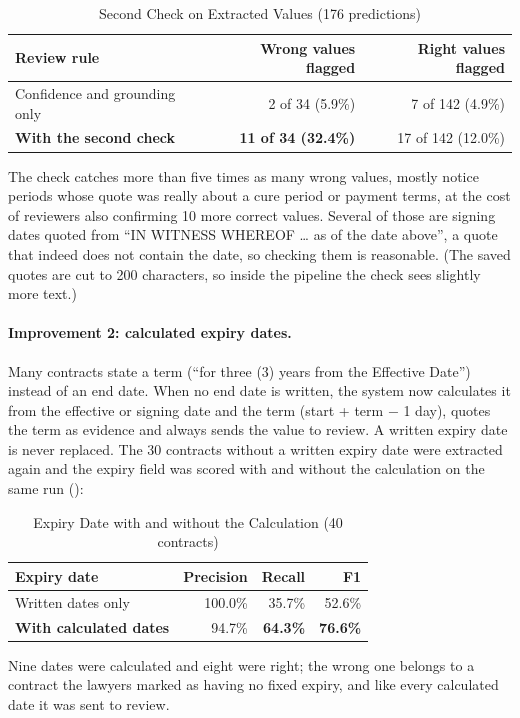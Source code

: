 \begin{table}[H]\centering
\caption{Second Check on Extracted Values (176 predictions)}\label{tab:ev-verify}
\begin{tabular}{|l|r|r|}\hline
\textbf{Review rule} & \textbf{Wrong values flagged} & \textbf{Right values flagged} \\ \hline
Confidence and grounding only & 2 of 34 (5.9\%) & 7 of 142 (4.9\%) \\ \hline
\textbf{With the second check} & \textbf{11 of 34 (32.4\%)} & 17 of 142 (12.0\%) \\ \hline
\end{tabular}
\end{table}
The check catches more than five times as many wrong values, mostly notice periods whose quote was really
about a cure period or payment terms, at the cost of reviewers also confirming 10 more correct values. Several
of those are signing dates quoted from ``IN WITNESS WHEREOF \dots{} as of the date above'', a quote that indeed
does not contain the date, so checking them is reasonable. (The saved quotes are cut to 200 characters, so
inside the pipeline the check sees slightly more text.)

\paragraph*{Improvement 2: calculated expiry dates.} Many contracts state a term (``for three (3) years from the
Effective Date'') instead of an end date. When no end date is written, the system now calculates it from the
effective or signing date and the term (start + term $-$ 1 day), quotes the term as evidence and always sends
the value to review. A written expiry date is never replaced. The 30 contracts without a written expiry date
were extracted again and the expiry field was scored with and without the calculation on the same run
():

\begin{table}[H]\centering
\caption{Expiry Date with and without the Calculation (40 contracts)}\label{tab:ev-expiry}
\begin{tabular}{|l|r|r|r|}\hline
\textbf{Expiry date} & \textbf{Precision} & \textbf{Recall} & \textbf{F1} \\ \hline
Written dates only & 100.0\% & 35.7\% & 52.6\% \\ \hline
\textbf{With calculated dates} & 94.7\% & \textbf{64.3\%} & \textbf{76.6\%} \\ \hline
\end{tabular}
\end{table}
Nine dates were calculated and eight were right; the wrong one belongs to a contract the lawyers marked as
having no fixed expiry, and like every calculated date it was sent to review.

